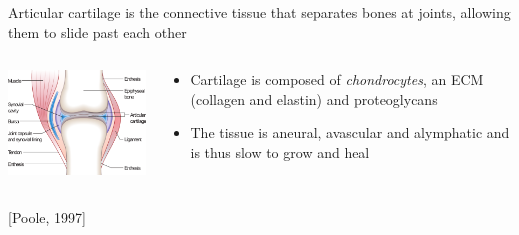 \documentclass[ignorenonframetext]{beamer}
\newcommand{\references}[1] {
  \begin{flushright}
    \scriptsize [#1] \normalsize
  \end{flushright}
}
\begin{document}

\begin{frame}{Articular cartilage is the connective tissue that
    separates bones at joints, allowing them to slide past each other}

  \begin{columns}

    \begin{column}{6cm}
      \includegraphics[width=6cm]{../images/pdf/joint}
    \end{column}

    \begin{column}{6cm}
      \begin{itemize}
      \item <1-> Cartilage is composed of {\em chondrocytes}, an ECM
        (collagen and elastin) and proteoglycans\\[0.5cm]
        \pause
      \item<2-> The tissue is aneural, avascular and alymphatic and is
        thus slow to grow and heal
      \end{itemize}
    \end{column}

  \end{columns}

  \references{Poole, 1997}

\end{frame}
\end{document}
